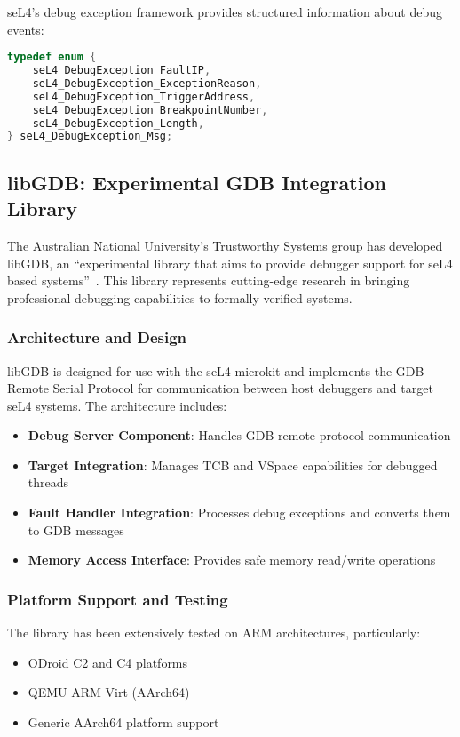 \documentclass[11pt,a4paper]{article}
\begin{document}
seL4's debug exception framework provides structured information about debug events:

\begin{lstlisting}[caption=Debug Exception Message Format, language=C]
typedef enum {
    seL4_DebugException_FaultIP,
    seL4_DebugException_ExceptionReason,
    seL4_DebugException_TriggerAddress,
    seL4_DebugException_BreakpointNumber,
    seL4_DebugException_Length,
} seL4_DebugException_Msg;
\end{lstlisting}

\subsection{libGDB: Experimental GDB Integration Library}

The Australian National University's Trustworthy Systems group has developed libGDB, an ``experimental library that aims to provide debugger support for seL4 based systems''~\cite{libgdb-github}. This library represents cutting-edge research in bringing professional debugging capabilities to formally verified systems.

\subsubsection{Architecture and Design}

libGDB is designed for use with the seL4 microkit and implements the GDB Remote Serial Protocol for communication between host debuggers and target seL4 systems. The architecture includes:

\begin{itemize}
\item \textbf{Debug Server Component}: Handles GDB remote protocol communication
\item \textbf{Target Integration}: Manages TCB and VSpace capabilities for debugged threads
\item \textbf{Fault Handler Integration}: Processes debug exceptions and converts them to GDB messages
\item \textbf{Memory Access Interface}: Provides safe memory read/write operations
\end{itemize}

\subsubsection{Platform Support and Testing}

The library has been extensively tested on ARM architectures, particularly:
\begin{itemize}
\item ODroid C2 and C4 platforms
\item QEMU ARM Virt (AArch64)
\item Generic AArch64 platform support
\end{itemize}
\end{document}
